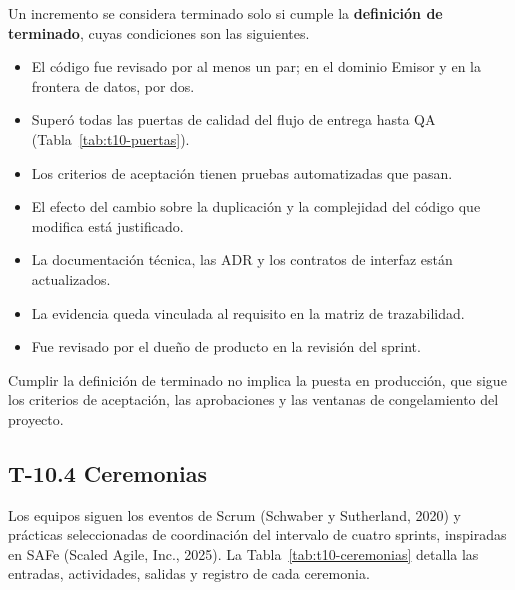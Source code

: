 \documentclass[11pt]{article}
\providecommand{\tightlist}{%
  \setlength{\itemsep}{0pt}\setlength{\parskip}{0pt}}
\begin{document}
Un incremento se considera terminado solo si cumple la \textbf{definición de terminado}, cuyas condiciones son las siguientes.

\begin{itemize}
\tightlist
\item
  El código fue revisado por al menos un par; en el dominio Emisor y en la frontera de datos, por dos.
\item
  Superó todas las puertas de calidad del flujo de entrega hasta QA (Tabla~\mbox{\ref{tab:t10-puertas}}).
\item
  Los criterios de aceptación tienen pruebas automatizadas que pasan.
\item
  El efecto del cambio sobre la duplicación y la complejidad del código que modifica está justificado.
\item
  La documentación técnica, las ADR y los contratos de interfaz están actualizados.
\item
  La evidencia queda vinculada al requisito en la matriz de trazabilidad.
\item
  Fue revisado por el dueño de producto en la revisión del sprint.
\end{itemize}

Cumplir la definición de terminado no implica la puesta en producción, que sigue los criterios de aceptación, las aprobaciones y las ventanas de congelamiento del proyecto.

\subsection{T-10.4 Ceremonias}\label{t10-4}

Los equipos siguen los eventos de Scrum (Schwaber y Sutherland, 2020) y prácticas seleccionadas de coordinación del intervalo de cuatro sprints, inspiradas en SAFe (Scaled Agile, Inc., 2025). La Tabla~\mbox{\ref{tab:t10-ceremonias}} detalla las entradas, actividades, salidas y registro de cada ceremonia.
\end{document}
